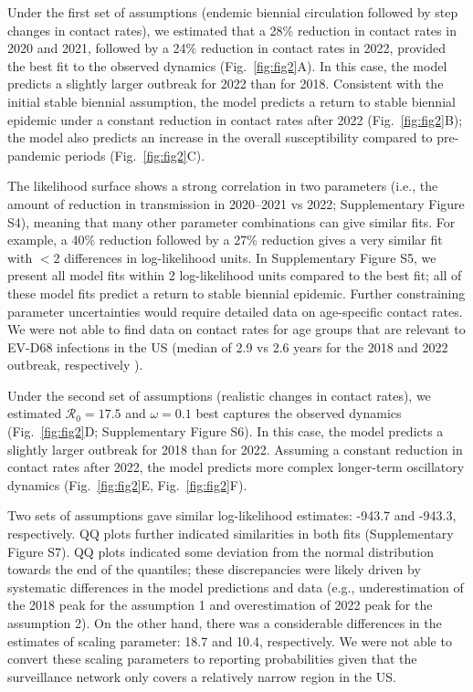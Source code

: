 \documentclass[12pt]{article}
\newcommand{\fref}[1]{Fig.~\ref{fig:#1}}
\begin{document}
Under the first set of assumptions (endemic biennial circulation followed by step changes in contact rates), we estimated that a 28\% reduction in contact rates in 2020 and 2021, followed by a 24\% reduction in contact rates in 2022, provided the best fit to the observed dynamics (\fref{fig2}A).
In this case, the model predicts a slightly larger outbreak for 2022 than for 2018.
Consistent with the initial stable biennial assumption, the model predicts a return to stable biennial epidemic under a constant reduction in contact rates after 2022 (\fref{fig2}B);
the model also predicts an increase in the overall susceptibility compared to pre-pandemic periods (\fref{fig2}C).

The likelihood surface shows a strong correlation in two parameters (i.e., the amount of reduction in transmission in 2020--2021 vs 2022; Supplementary Figure S4), meaning that many other parameter combinations can give similar fits.
For example, a 40\% reduction followed by a 27\% reduction gives a very similar fit with $<2$ differences in log-likelihood units.
In Supplementary Figure S5, we present all model fits within 2 log-likelihood units compared to the best fit;
all of these model fits predict a return to stable biennial epidemic.
Further constraining parameter uncertainties would require detailed data on age-specific contact rates.
We were not able to find data on contact rates for age groups that are relevant to EV-D68 infections in the US (median of 2.9 vs 2.6 years for the 2018 and 2022 outbreak, respectively \citep{shah2021enterovirus,ma2022increase}).

Under the second set of assumptions (realistic changes in contact rates), we estimated $\mathcal R_0 =17.5$ and $\omega = 0.1$ best captures the observed dynamics (\fref{fig2}D; Supplementary Figure S6).
In this case, the model predicts a slightly larger outbreak for 2018 than for 2022.
Assuming a constant reduction in contact rates after 2022, the model predicts more complex longer-term oscillatory dynamics (\fref{fig2}E, \fref{fig2}F).

Two sets of assumptions gave similar log-likelihood estimates: -943.7 and -943.3, respectively.
QQ plots further indicated similarities in both fits (Supplementary Figure S7).
QQ plots indicated some deviation from the normal distribution towards the end of the quantiles;
these discrepancies were likely driven by systematic differences in the model predictions and data (e.g., underestimation of the 2018 peak for the assumption 1 and overestimation of 2022 peak for the assumption 2).
On the other hand, there was a considerable differences in the estimates of scaling parameter: 18.7 and 10.4, respectively.
We were not able to convert these scaling parameters to reporting probabilities given that the surveillance network only covers a relatively narrow region in the US.
\end{document}
